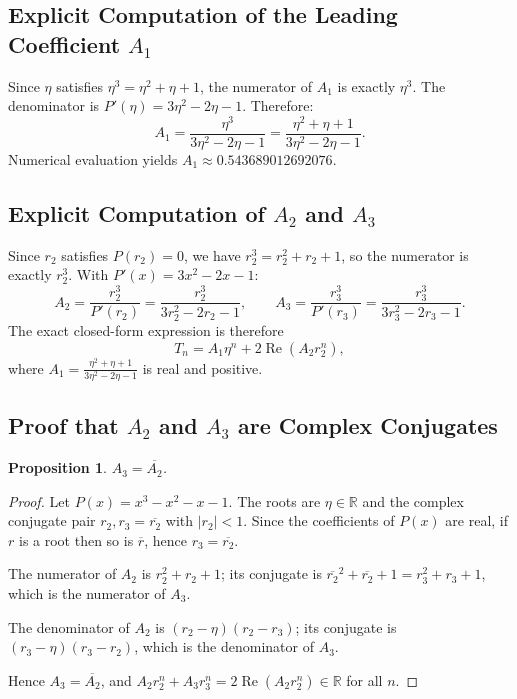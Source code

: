 \documentclass[11pt,a4paper]{article}
\newtheorem{proposition}[theorem]{Proposition}
\theoremstyle{definition}
\theoremstyle{remark}
\begin{document}
\subsection{Explicit Computation of the Leading Coefficient \texorpdfstring{$A_1$}{A1}}

Since $\eta$ satisfies $\eta^3=\eta^2+\eta+1$, the numerator of $A_1$ is exactly $\eta^3$.
The denominator is $P'(\eta)=3\eta^2-2\eta-1$. Therefore:
\[
  A_1=\frac{\eta^3}{3\eta^2-2\eta-1}=\frac{\eta^2+\eta+1}{3\eta^2-2\eta-1}.
\]
Numerical evaluation yields $A_1\approx0.543689012692076$.

\subsection{Explicit Computation of \texorpdfstring{$A_2$}{A2} and \texorpdfstring{$A_3$}{A3}}

Since $r_2$ satisfies $P(r_2)=0$, we have $r_2^3=r_2^2+r_2+1$, so the numerator is exactly
$r_2^3$. With $P'(x)=3x^2-2x-1$:
\[
  A_2=\frac{r_2^3}{P'(r_2)}=\frac{r_2^3}{3r_2^2-2r_2-1},\qquad
  A_3=\frac{r_3^3}{P'(r_3)}=\frac{r_3^3}{3r_3^2-2r_3-1}.
\]
The exact closed-form expression is therefore
\[
  T_n=A_1\eta^n+2\operatorname{Re}(A_2r_2^n),
\]
where $A_1=\tfrac{\eta^2+\eta+1}{3\eta^2-2\eta-1}$ is real and positive.

\subsection{Proof that \texorpdfstring{$A_2$}{A2} and \texorpdfstring{$A_3$}{A3} are Complex Conjugates}

\begin{proposition}
$A_3=\overline{A_2}$.
\end{proposition}

\begin{proof}
Let $P(x)=x^3-x^2-x-1$. The roots are $\eta\in\mathbb{R}$ and the complex conjugate pair
$r_2,r_3=\overline{r_2}$ with $|r_2|<1$. Since the coefficients of $P(x)$ are real, if $r$ is
a root then so is $\overline{r}$, hence $r_3=\overline{r_2}$.

The numerator of $A_2$ is $r_2^2+r_2+1$; its conjugate is
$\overline{r_2}^2+\overline{r_2}+1=r_3^2+r_3+1$, which is the numerator of $A_3$.

The denominator of $A_2$ is $(r_2-\eta)(r_2-r_3)$; its conjugate is
$(r_3-\eta)(r_3-r_2)$, which is the denominator of $A_3$.

Hence $A_3=\overline{A_2}$, and $A_2r_2^n+A_3r_3^n=2\operatorname{Re}(A_2r_2^n)\in\mathbb{R}$
for all $n$.
\end{proof}
\end{document}
